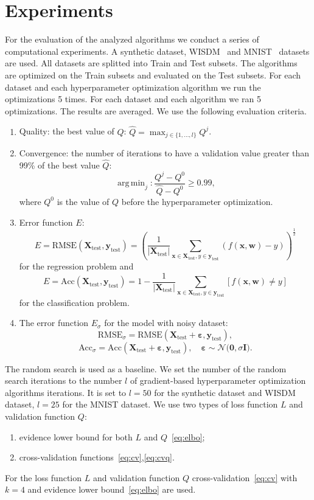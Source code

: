 \documentclass[smallcondensed]{svjour3}
\DeclareMathOperator*{\argmin}{arg\,min}
\begin{document}
\section{Experiments}
\label{experiments}
For the evaluation of the analyzed algorithms we conduct a series of computational experiments. A synthetic dataset, WISDM~\cite{wisdm} and MNIST~\cite{mnist} datasets are used. All datasets are splitted into Train and Test subsets. The algorithms are optimized on the Train subsets and evaluated on the Test subsets. For each dataset and each hyperparameter optimization algorithm we run the optimizations 5 times. For each dataset and each algorithm we ran 5 optimizations. The results are averaged. 
We use the following evaluation criteria.
\begin{enumerate}
\item Quality: the best value of $Q$:  $\hat{Q} = \max_{j \in \{1, \dots, l\}}Q^j$.
\item Convergence: the number of iterations to have a validation value greater than 99\% of the best value $\hat{Q}$:
\[
    \argmin_{j}: \frac{Q^j - Q^0}{\hat{Q} - Q^0} \geq 0.99,
\]
where $Q^0$ is the value of $Q$ before the hyperparameter optimization. 


\item Error function $E$:\[
    E = \text{RMSE}(\mathbf{X}_\text{test}, \mathbf{y}_\text{test}) = \left (\frac{1}{|\mathbf{X}_\text{test}|}\sum_{\mathbf{x} \in\mathbf{X}_\text{test}, y \in \mathbf{y}_\text{test}}  (f(\mathbf{x}, \mathbf{w})-y)\right)^{\frac{1}{2}}
\]
for the regression problem and
\[
    E = \text{Acc}(\mathbf{X}_\text{test}, \mathbf{y}_\text{test}) = 1 - \frac{1}{|\mathbf{X}_\text{test}|}\sum_{\mathbf{x} \in\mathbf{X}_\text{test}, y \in \mathbf{y}_\text{test}} [f(\mathbf{x}, \mathbf{w}) \neq y]
\]
for the classification problem.


\item The error function  $E_\sigma$ for the model with noisy dataset:
\[
    \text{RMSE}_\sigma =  \text{RMSE}(\mathbf{X}_\text{test} +  \boldsymbol{\varepsilon}, \mathbf{y}_\text{test}),\]\[\text{Acc}_\sigma =  \text{Acc}(\mathbf{X}_\text{test} +  \boldsymbol{\varepsilon}, \mathbf{y}_\text{test}),  \quad \boldsymbol{\varepsilon} \sim \mathcal{N}\bigl(\mathbf{0}, \sigma\mathbf{I}\bigr).
\]
\end{enumerate}



The random search is used as a baseline. We set the number of the random search iterations to the number $l$ of gradient-based hyperparameter optimization algorithms iterations. It is set to $l=50$ for the synthetic dataset and WISDM dataset, $l=25$ for the MNIST dataset. We use two types of loss function $L$ and validation function $Q$:
\begin{enumerate}
\item evidence lower bound for both $L$ and $Q$~\eqref{eq:elbo};
\item cross-validation functions~\eqref{eq:cv},\eqref{eq:cvq}.
\end{enumerate}
For the loss  function $L$ and validation function $Q$ cross-validation~\eqref{eq:cv} with $k=4$ and evidence lower bound~\eqref{eq:elbo} are used. 
\end{document}
